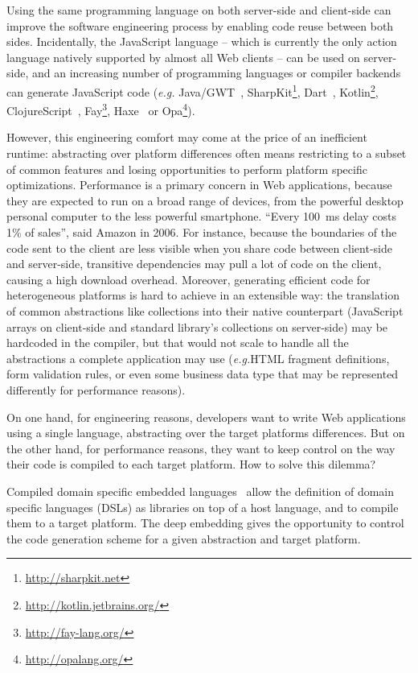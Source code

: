 \documentclass[preprint]{sigplanconf}
\newcommand{\eg}{\emph{e.g.}}
\begin{document}
Using the same programming language on both server-side and client-side can improve the software engineering
process by enabling code reuse between both sides. Incidentally, the JavaScript language -- which is currently the
only action language natively supported by almost all Web clients -- can be used on server-side, and an increasing
number of programming languages or compiler backends can generate JavaScript code (\eg
Java/GWT~\cite{Chaganti07_GWT}, SharpKit\footnote{\href{http://sharpkit.net}{http://sharpkit.net}},
Dart~\cite{Griffith11_Dart}, Kotlin\footnote{\href{http://kotlin.jetbrains.org/}{http://kotlin.jetbrains.org/}},
ClojureScript~\cite{McGranaghan11_ClojureScript}, Fay\footnote{\href{http://fay-lang.org/}{http://fay-lang.org/}},
Haxe~\cite{Cannasse08_HaXe} or Opa\footnote{\href{http://opalang.org/}{http://opalang.org/}}).

However, this engineering comfort may come at the price of an inefficient runtime: abstracting over platform
differences often means restricting to a subset of common features and losing opportunities to perform platform
specific optimizations. Performance is a primary concern in Web applications, because they are expected to run on a
broad range of devices, from the powerful desktop personal computer to the less powerful smartphone. “Every 100~ms
delay costs 1\% of sales”, said Amazon in 2006. For instance, because the boundaries of the code sent to the client
are less visible when you share code between client-side and server-side, transitive dependencies may pull a lot of
code on the client, causing a high download overhead. Moreover, generating efficient code for heterogeneous platforms
is hard to achieve in an extensible way: the translation of common abstractions like collections into their native
counterpart (JavaScript arrays on client-side and standard library’s collections on server-side) may be hardcoded in
the compiler, but that would not scale to handle all the abstractions a complete application may use (\eg HTML
fragment definitions, form validation rules, or even some business data type that may be represented differently for
performance reasons).

On one hand, for engineering reasons, developers want to write Web applications using a single language, abstracting
over the target platforms differences. But on the other hand, for performance reasons, they want to keep
control on the way their code is compiled to each target platform. How to solve this dilemma?

Compiled domain specific embedded languages~\cite{Elliott2003_Compiling} allow the definition of domain specific
languages (DSLs) as libraries on top of a host language, and to compile them to a target platform. The deep embedding
gives the opportunity to control the code generation scheme for a given abstraction and target platform.
\end{document}

